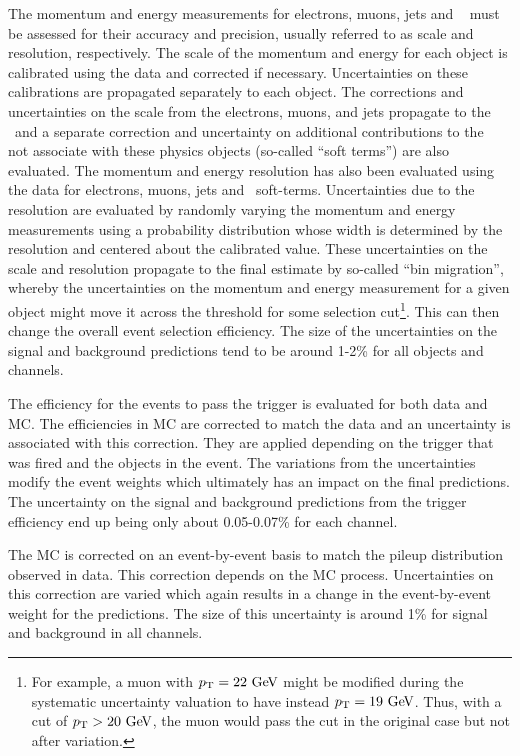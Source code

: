 The momentum and energy measurements for electrons, muons, jets and \MET~
must be assessed for their accuracy and precision, usually referred to
as scale and resolution, respectively. The scale of the momentum and energy 
for each object is calibrated using the data and corrected if necessary.
Uncertainties on these calibrations are propagated separately to each object.
The corrections and uncertainties on the scale
from the electrons, muons, and jets propagate to the \MET~and a separate
correction and uncertainty on additional contributions to the \MET~
not associate with these physics objects (so-called ``soft terms'')
are also evaluated. 
The momentum and energy resolution has also been evaluated using the data
for electrons, muons, jets and \MET~soft-terms.  Uncertainties due to the
resolution are evaluated by randomly varying the momentum and energy measurements
using a probability distribution whose width is determined by the resolution
and centered about the calibrated value. These uncertainties on the scale
and resolution propagate to the final estimate by so-called ``bin migration'',
whereby the uncertainties on the momentum and energy measurement 
for a given object might move it across the threshold for some 
selection cut\footnote{For example, a muon with $\pt = 22 \GeV$ might
be modified during the systematic uncertainty valuation to have instead
$\pt = 19 \GeV$. Thus, with a cut of $\pt > 20 \GeV$, the muon would pass the
cut in the original case but not after variation.}. This can 
then change the overall event selection efficiency. The size of the uncertainties
on the signal and background predictions tend to be around 1-2\% for
all objects and channels.


The efficiency for the events to pass the trigger is evaluated for both 
data and MC.  The efficiencies in MC are corrected to match the data
and an uncertainty is associated with this correction.  They are applied
depending on the trigger that was fired and the objects in the event.
The variations from the uncertainties
modify the event weights which ultimately has an impact on the final predictions.
The uncertainty on the signal and background predictions from the trigger
efficiency end up being only about 0.05-0.07\%  for each channel.

The MC is corrected on an event-by-event basis to match the 
pileup distribution observed in data. This correction depends on the 
MC process. Uncertainties on this correction are varied which again
results in a change in the event-by-event weight for the predictions. The
size of this uncertainty is around 1\% for signal and background in all channels.


